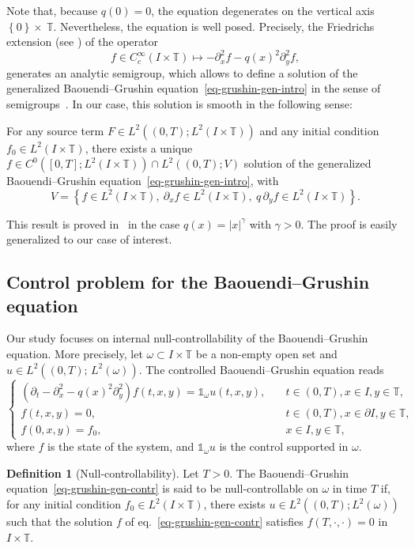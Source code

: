 \documentclass[10pt]{amsart}
\theoremstyle{definition}\newtheorem{defi}[theo]{Definition}\newtheorem{rema}[theo]{Remark}\newtheorem{exam}[theo]{Example}\newtheorem{exem}[theo]{Example}\newtheorem{nota}[theo]{Notation}
\newcommand{\1}{\mathds 1}
\newcommand{\T}{\mathbb{T}}
\renewcommand{\o}{\omega}
\begin{document}
Note that, because $q(0) = 0$, the equation degenerates on the vertical axis $\left\lbrace 0 \right\rbrace \times~\T$. Nevertheless, the equation is well posed. Precisely, the Friedrichs extension (see \cite[Section~4.3]{Helffer13}) of the operator
\[
f \in C^\infty_c(I\times \T) \mapsto - \partial^2_x f - q(x)^2 \partial_y^2 f,
\]
generates an analytic semigroup, which allows to define a solution of the generalized Baouendi--Grushin equation~\eqref{eq-grushin-gen-intro} in the sense of semigroups~\cite{Brezis11}. In our case, this solution is smooth in the following sense:

\begin{prop}\label{prop_wellposedness}
For any source term $F \in L^2((0,T);{L^2(I\times \T)})$ and any initial condition $f_0 \in L^2(I\times \T)$, there exists a unique $f \in C^0([0,T];L^2(I\times \T)) \cap L^2((0,T);V)$ solution of the generalized Baouendi--Grushin equation~\eqref{eq-grushin-gen-intro}, with
\[
V = \left\lbrace f \in L^2(I\times \T), \ \partial_x f \in L^2(I\times \T),\ q\, \partial_y f \in L^2(I\times \T) \right\rbrace.
\]
\end{prop}

This result is proved in~\cite{BCG14} in the case $q(x) = |x|^\gamma$ with $\gamma>0$. The proof is easily generalized to our case of interest.

\subsection{Control problem for the Baouendi--Grushin equation}

Our study focuses on internal null-controllability of the Baouendi--Grushin equation. More precisely, let $\omega \subset I \times \T$ be a non-empty open set and $u \in L^2((0,T); \, L^2(\o))$. The controlled Baouendi--Grushin equation reads
\begin{equation}\label{eq-grushin-gen-contr}
\left\{
\begin{array}{ll}
(\partial_t-\partial_x^2 - q(x)^2 \partial_y^2)f(t,x,y) = \mathds 1_\o u(t,x,y),&\quad t\in (0,T), x\in I, y\in \T,\\
f(t,x,y) = 0,&\quad t\in (0,T), x \in \partial I, y\in \T, \\
f(0,x,y) = f_0, & \quad x\in I, y\in \T,
\end{array}\right.
\end{equation}
where $f$ is the state of the system, and $\1_\o u$ is the control supported in $\o$.

\begin{defi}[Null-controllability] Let $T>0$. The Baouendi--Grushin equation~\eqref{eq-grushin-gen-contr} is said to be null-controllable on $\o$ in time $T$ if, for any initial condition
$f_0 \in L^2(I\times \T)$, there exists $u \in L^2((0,T);L^2(\o))$ such that the solution $f$ of eq.~\eqref{eq-grushin-gen-contr} satisfies $f(T,\cdot,\cdot) = 0$ in $I\times \T$.
\end{defi}
\end{document}

